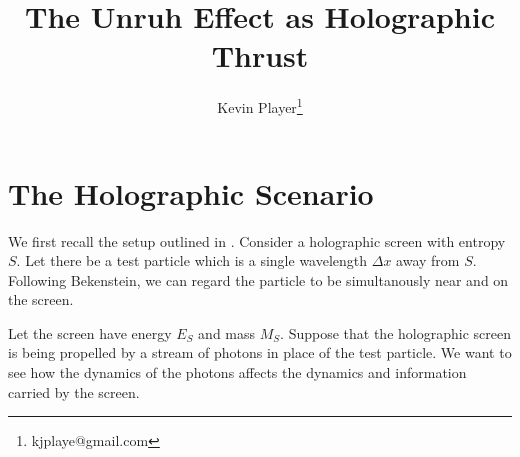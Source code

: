 \documentclass[12pt,a4paper]{article}
\begin{document}
\title{The Unruh Effect as Holographic Thrust}
\author[1]{Kevin Player\footnote{kjplaye@gmail.com}}

\maketitle


\section{The Holographic Scenario}
We first recall the setup outlined in \cite{entropic}. Consider a holographic screen with entropy $S$.  Let there be a test particle which is a single wavelength $\Delta x$ away from $S$.  Following Bekenstein, we can regard the particle to be simultanously near and on the screen.

Let the screen have energy $E_S$ and mass $M_S$.  Suppose that the holographic screen is being propelled by a stream of photons in place of the test particle.  We want to see how the dynamics of the photons affects the dynamics and information carried by the screen.
\end{document}
